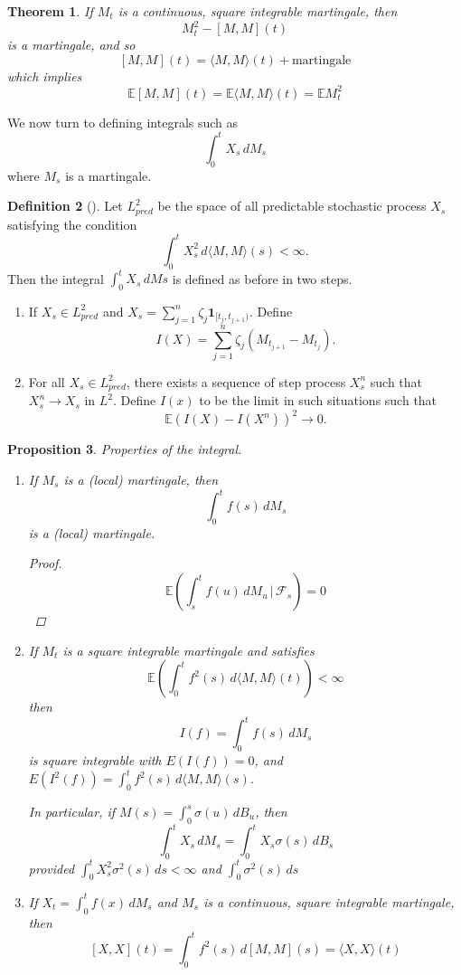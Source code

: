 \documentclass[10pt, oneside, reqno]{amsart}
\theoremstyle{plain}%
\newtheorem{thm}{Theorem}[section]
\newtheorem{prop}[thm]{Proposition}
\theoremstyle{definition}
\newtheorem{defn}[thm]{Definition}
\theoremstyle{remark}
\newcommand{\given}{ \, | \,}
\newcommand{\E}{\mathbb{E}}
\newcommand{\sigf}{\mathcal{F}}
\begin{document}
\begin{thm}
	If $M_t$ is a continuous, square integrable martingale, then \[
		M_t^2 - [M, M](t)
	\] is a martingale, and so \[
		[M, M](t) = \langle M, M \rangle(t) + \text{martingale}
	\] which implies \[
		\E[M, M](t) = \E\langle M , M \rangle(t) = \E M_t^2
	\]
\end{thm}


We now turn to defining integrals such as \[
	\int_0^t X_s \, dM_s
\] where $M_s$ is a martingale.

\begin{defn}[]
	Let $L^2_{pred}$ be the space of all predictable stochastic process $X_s$ satisfying the condition \[
		\int_0^t X_s^2 \, d \langle M, M \rangle (s) < \infty.
	\] Then the integral $\int_0^t X_s \, dMs$ is defined as before in two steps.
	\begin{enumerate}[(1)]
		\item If $X_s \in L^2_{pred}$ and $X_s = \sum_{j=1}^n \zeta_j \mathbf{1}_{[t_j, t_{j+1})}$.  Define \[
			I(X) = \sum_{j=1}^n \zeta_j (M_{t_{j+1}} - M_{t_j}).
		\] 
		\item For all $X_s \in L^2_{pred}$, there exists a sequence of step process $X_s^n$ such that $X_s^n \rightarrow X_s$ in $L^2$.  Define $I(x)$ to be the limit in such situations such that \[
			\E(I(X) - I(X^n))^2 \rightarrow 0.
		\]
	\end{enumerate}
\end{defn}
\begin{prop}
	Properties of the integral.  
	\begin{enumerate}
		\item If $M_s$ is a (local) martingale, then \[
			\int_0^t f(s) \, dM_s
		\] is a (local) martingale.  
		
		\begin{proof}
			\[
				\E(\int_s^t f(u) \, dM_u \given \sigf_s) = 0
			\]
		\end{proof}
		\item If $M_t$ is a square integrable martingale and satisfies \[
			\E( \int_0^t f^2(s)\,  d\langle M, M\rangle (t) ) < \infty
		\] then \[
			I(f) = \int_0^t f(s) \, dM_s 
		\] is square integrable with $E(I(f)) = 0$, and $E(I^2(f)) = \int_0^t f^2(s) \, d\langle M, M \rangle(s)$. 
		
		In particular, if $M(s) = \int_0^s \sigma(u) \, dB_u$, then \[
			\int_0^t X_s \, dM_s = \int_0^t X_s \sigma(s) \, dB_s
		\] provided $\int_0^t X_s^2 \sigma^2(s) \, ds < \infty$ and $\int_0^t \sigma^2(s) \, ds$
		\item If $X_t = \int_0^t f(x) \, dM_s$ and $M_s$ is a continuous, square integrable martingale, then \[
			[X, X](t) = \int_0^t f^2(s) \, d[M, M](s) = \langle X, X \rangle(t)
		\]
	\end{enumerate}
\end{prop}
\end{document}
